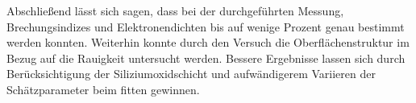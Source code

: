 
%

Abschließend lässt sich sagen, dass bei der durchgeführten Messung, 
Brechungsindizes und Elektronendichten bis auf wenige Prozent genau bestimmt werden konnten.
Weiterhin konnte durch den Versuch die Oberflächenstruktur im Bezug auf die Rauigkeit untersucht werden.
Bessere Ergebnisse lassen sich durch Berücksichtigung der Siliziumoxidschicht und
aufwändigerem Variieren der Schätzparameter beim fitten gewinnen.












%
%
